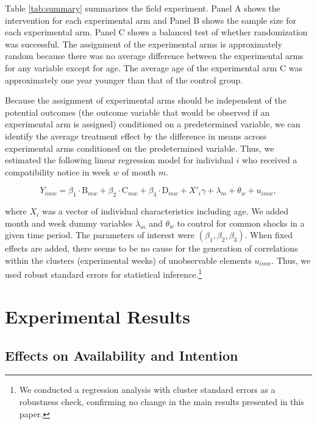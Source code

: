 \documentclass[12pt, a4paper]{article}
\begin{document}
Table \ref{tab:summary} summarizes the field experiment. Panel A shows the intervention for each experimental arm and Panel B shows the sample size for each experimental arm. Panel C shows a balanced test of whether randomization was successful. The assignment of the experimental arms is approximately random because there was no average difference between the experimental arms for any variable except for age. The average age of the experimental arm C was approximately one year younger than that of the control group.

Because the assignment of experimental arms should be independent of the potential outcomes (the outcome variable that would be observed if an experimental arm is assigned) conditioned on a predetermined variable, we can identify the average treatment effect by the difference in means across experimental arms conditioned on the predetermined variable. Thus, we estimated the following linear regression model for individual \(i\) who received a compatibility notice in week \(w\) of month \(m\).

\begin{equation}
  Y_{imw} =
  \beta_1 \cdot \text{B}_{mw} + \beta_2 \cdot \text{C}_{mw} + \beta_3 \cdot \text{D}_{mw}
  + X'_i \gamma + \lambda_m + \theta_w + u_{imw}, \label{eq:reg}
\end{equation}

\noindent
where \(X_i\) was a vector of individual characteristics including age. We added month and week dummy variables \(\lambda_m\) and \(\theta_w\) to control for common shocks in a given time period. The parameters of interest were \((\beta_1, \beta_2, \beta_3)\). When fixed effects are added, there seems to be no cause for the generation of correlations within the clusters (experimental weeks) of unobservable elements \(u_{imw}\). Thus, we used robust standard errors for statistical inference.\footnote{We conducted a regression analysis with cluster standard errors as a robustness check, confirming no change in the main results presented in this paper.}

\hypertarget{result}{%
\section{Experimental Results}\label{result}}

\hypertarget{main}{%
\subsection{Effects on Availability and Intention}\label{main}}
\end{document}
